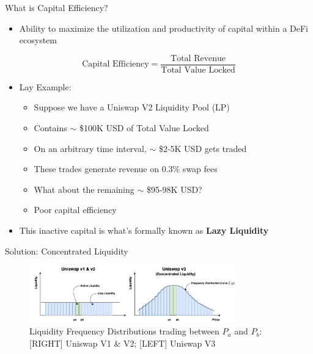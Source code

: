 \documentclass[10pt,xcolor=svgnames]{beamer} %
\begin{document}
\begin{frame}{What is Capital Efficiency?} 

\begin{itemize}
  \item Ability to maximize the utilization and productivity of capital within a DeFi ecosystem
\end{itemize}

 \[ \textrm{Capital Efficiency} = \frac{\textrm{Total Revenue}}{\textrm{Total Value Locked}} \]

\begin{itemize} 
\item Lay Example:
     \begin{itemize} 
        \item Suppose we have a Uniswap V2 Liquidity Pool (LP)
        \item Contains $\sim$ \$100K USD of Total Value Locked 
        \item On an arbitrary time interval, $\sim$ \$2-5K USD gets traded 
        \item These trades generate revenue on 0.3\% swap fees
        \item What about the remaining $\sim$ \$95-98K USD?
        \item Poor capital efficiency 
     \end{itemize}
\item This inactive capital is what's formally known as \textbf{Lazy Liquidity}    
\end{itemize}

\end{frame}

\begin{frame}{Solution: Concentrated Liquidity} 

\begin{figure}[h!]
\includegraphics[width=3.5in]{img/concentrated_liquidity.png}
\caption{Liquidity Frequency Distributions trading between $P_{a}$ and $P_{b}$: [RIGHT] Uniswap V1 \& V2; [LEFT] Uniswap V3} 
\label{fig:uniswap_v3}
\end{figure}

\end{frame}
\end{document}
